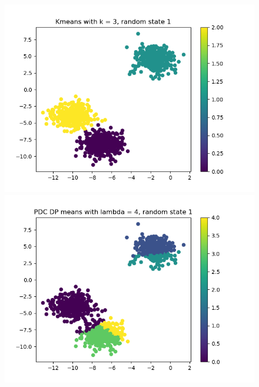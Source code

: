 \documentclass[12pt]{article}
\begin{document}
\begin{figure}[!h]
        \begin{minipage}{0.5\textwidth}
		\centering
		\includegraphics[scale=0.4]{images/task2_drs_rs1__k3}
	\end{minipage}
        \begin{minipage}{0.5\textwidth}
		\centering
		\includegraphics[scale=0.4]{images/task2_drs_rs1__l4}
	\end{minipage}\label{fig:figure3}
\end{figure}
\end{document}
